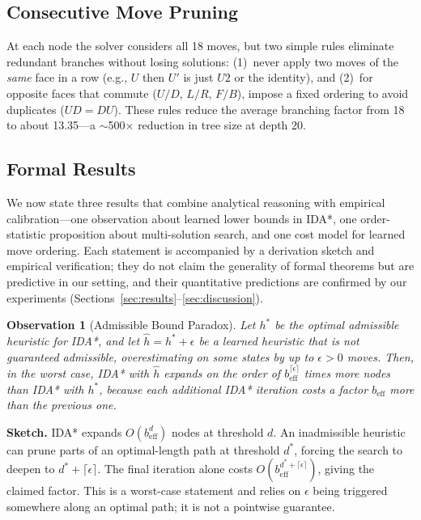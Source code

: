 \documentclass[graybox]{svmult}
\newtheorem{observation}{Observation}
\begin{document}
\subsection{Consecutive Move Pruning}
At each node the solver considers all 18 moves, but two simple rules eliminate redundant branches without losing solutions: (1)~never apply two moves of the \emph{same} face in a row (e.g., $U$ then $U'$ is just $U2$ or the identity), and (2)~for opposite faces that commute ($U/D$, $L/R$, $F/B$), impose a fixed ordering to avoid duplicates ($UD = DU$). These rules reduce the average branching factor from 18 to about 13.35---a $\sim$500$\times$ reduction in tree size at depth 20.

\subsection{Formal Results}
\label{sec:formal}

\begin{sloppypar}
We now state three results that combine analytical reasoning with empirical calibration---one observation about learned lower bounds in IDA*, one order-statistic proposition about multi-solution search, and one cost model for learned move ordering. Each statement is accompanied by a derivation sketch and empirical verification; they do not claim the generality of formal theorems but are predictive in our setting, and their quantitative predictions are confirmed by our experiments (Sections~\ref{sec:results}--\ref{sec:discussion}).
\end{sloppypar}

\begin{observation}[Admissible Bound Paradox]
\label{thm:bound-paradox}
Let $h^*$ be the optimal admissible heuristic for IDA*, and let $\hat{h} = h^* + \epsilon$ be a learned heuristic that is \emph{not} guaranteed admissible, overestimating on some states by up to $\epsilon > 0$ moves. Then, in the worst case, IDA* with $\hat{h}$ expands on the order of $b_{\mathrm{eff}}^{\lceil\epsilon\rceil}$ times more nodes than IDA* with $h^*$, because each additional IDA* iteration costs a factor $b_{\mathrm{eff}}$ more than the previous one.
\end{observation}

\textbf{Sketch.} IDA* expands $O(b_{\mathrm{eff}}^d)$ nodes at threshold $d$. An inadmissible heuristic can prune parts of an optimal-length path at threshold $d^*$, forcing the search to deepen to $d^* + \lceil\epsilon\rceil$. The final iteration alone costs $O(b_{\mathrm{eff}}^{d^* + \lceil\epsilon\rceil})$, giving the claimed factor. This is a worst-case statement and relies on $\epsilon$ being triggered somewhere along an optimal path; it is not a pointwise guarantee.
\end{document}
